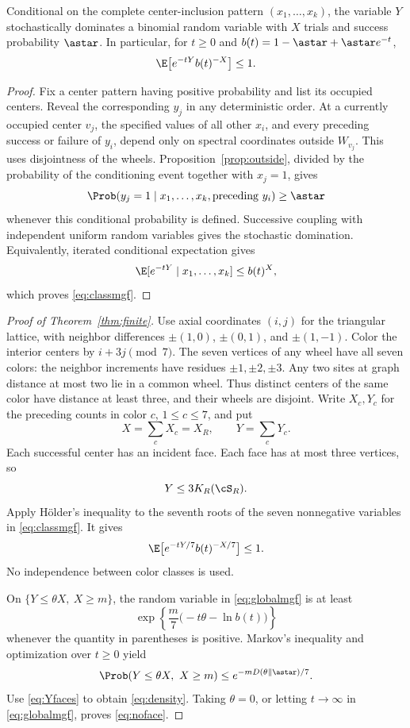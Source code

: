 \begin{lemma}\label{lem:bernoulli}
Conditional on the complete center-inclusion pattern $(x_1,\ldots,x_k)$, the variable $Y$ stochastically dominates a binomial random variable with $X$ trials and success probability $\astar$. In particular, for $t\ge0$ and $b(t)=1-\astar+\astar e^{-t}$,
\begin{equation}\label{eq:classmgf}
 \E\bigl[e^{-tY}b(t)^{-X}\bigr]\le1.
\end{equation}
\end{lemma}
\begin{proof}
Fix a center pattern having positive probability and list its occupied centers. Reveal the corresponding $y_j$ in any deterministic order. At a currently occupied center $v_j$, the specified values of all other $x_i$, and every preceding success or failure of $y_i$, depend only on spectral coordinates outside $W_{v_j}$. This uses disjointness of the wheels. Proposition~\ref{prop:outside}, divided by the probability of the conditioning event together with $x_j=1$, gives
\[
 \Prob(y_j=1\mid x_1,\ldots,x_k,\text{preceding }y_i)\ge\astar
\]
whenever this conditional probability is defined. Successive coupling with independent uniform random variables gives the stochastic domination. Equivalently, iterated conditional expectation gives
\[
 \E[e^{-tY}\mid x_1,\ldots,x_k]\le b(t)^X,
\]
which proves \eqref{eq:classmgf}.
\end{proof}

\begin{proof}[Proof of Theorem~\ref{thm:finite}]
Use axial coordinates $(i,j)$ for the triangular lattice, with neighbor differences $\pm(1,0)$, $\pm(0,1)$, and $\pm(1,-1)$. Color the interior centers by $i+3j\pmod7$. The seven vertices of any wheel have all seven colors: the neighbor increments have residues $\pm1,\pm2,\pm3$. Any two sites at graph distance at most two lie in a common wheel. Thus distinct centers of the same color have distance at least three, and their wheels are disjoint. Write $X_c,Y_c$ for the preceding counts in color $c$, $1\le c\le7$, and put
\[
 X=\sum_cX_c=X_R,\qquad Y=\sum_cY_c.
\]
Each successful center has an incident face. Each face has at most three vertices, so
\begin{equation}\label{eq:Yfaces}
 Y\le3K_R(\cS_R).
\end{equation}
Apply H\"older's inequality to the seventh roots of the seven nonnegative variables in \eqref{eq:classmgf}. It gives
\begin{equation}\label{eq:globalmgf}
 \E\bigl[e^{-tY/7}b(t)^{-X/7}\bigr]\le1.
\end{equation}
No independence between color classes is used.

On $\{Y\le\theta X,\ X\ge m\}$, the random variable in \eqref{eq:globalmgf} is at least
\[
 \exp\left\{\frac{m}{7}\bigl(-t\theta-\ln b(t)\bigr)\right\}
\]
whenever the quantity in parentheses is positive. Markov's inequality and optimization over $t\ge0$ yield
\[
 \Prob(Y\le\theta X,\ X\ge m)
 \le e^{-mD(\theta\Vert\astar)/7}.
\]
Use \eqref{eq:Yfaces} to obtain \eqref{eq:density}. Taking $\theta=0$, or letting $t\to\infty$ in \eqref{eq:globalmgf}, proves \eqref{eq:noface}.
\end{proof}

